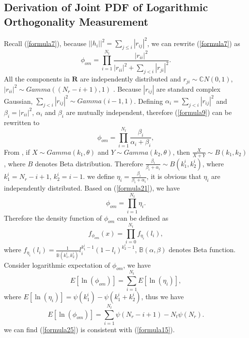 \documentclass[12pt,letter,final]{article}
\begin{document}
\begin{spacing}{2.5}
\section{Derivation of Joint PDF of Logarithmic Orthogonality Measurement}
Recall (\ref{formula7}), because $||h_{i}||^{2}=\sum_{j\leq i}|r_{ij}|^{2}$, we can rewrite (\ref{formula7}) as
\begin{equation}
\phi_{om}=\prod_{i=1}^{N_{t}}\frac{|r_{ii}|^{2}}{|r_{ii}|^{2}+\sum_{j<i}|r_{ji}|^{2}}.
\end{equation}
All the components in $\mathbf{R}$ are independently distributed and $r_{ji}\sim \mathbb{C}N(0,1)$, $|r_{ii}|^{2}\sim Gamma((N_{r}-i+1),1)$ \cite{nagar2011expectations}. Because $|r_{ij}|$ are standard complex Gaussian, $\sum_{j<i}|r_{ij}|^{2}\sim Gamma(i-1, 1)$. Defining $\alpha_{i}=\sum_{j<i}|r_{ij}|^{2}$ and $\beta_{i}=|r_{ii}|^{2}$, $\alpha_{i}$ and $\beta_{i}$ are mutually independent, therefore (\ref{formula9}) can be rewritten to 
\begin{equation}
\phi_{om}=\prod_{i=1}^{N_{t}}\frac{\beta_{i}}{\alpha_{i}+\beta_{i}},
\label{formula21}
\end{equation}
From \cite{gupta2004handbook}, if $X\sim Gamma(k_{1},\theta)$ and $Y\sim Gamma(k_{2},\theta)$, then $\frac{X}{X+Y}\sim B(k_{1},k_{2})$, where $B$ denotes Beta distribution. Therefore $\frac{\beta_{i}}{\beta_{i}+\alpha_{i}}\sim B(k^{i}_{1}, k^{i}_{2})$, where $k^{i}_{1}=N_{r}-i+1$, $k^{i}_{2}=i-1$. we define $\eta_{i}=\frac{\beta_{i}}{\beta_{i}+\alpha_{i}}$, it is obvious that $\eta_{i}$ are independently distributed. Based on (\ref{formula21}), we have 
\begin{equation}
\phi_{om}=\prod_{i=1}^{N_{t}}\eta_{i}.
\label{formula22}
\end{equation}
Therefore the density function of $\phi_{om}$ can be defined as
\begin{equation}
f_{\phi_{om}}(x)=\prod_{i=0}^{N_{t}}f_{\eta_{i}}(l_{i}),
\label{formula23}
\end{equation}
where $f_{\eta_{i}}(l_{i})=\frac{1}{\mathbb{B}(k^{i}_{1},k^{i}_{2})}l_{i}^{k^{i}_{1}-1}(1-l_{i})^{k^{i}_{2}-1}$, $\mathbb{B}(\alpha, \beta)$ denotes Beta function.
Consider logarithmic expectation of $\phi_{om}$, we have
\begin{equation}
E[\ln(\phi_{om})]=\sum_{i=1}^{N_{t}}E[\ln(\eta_{i})],
\label{formula24}
\end{equation}
where $E[\ln(\eta_{i})]=\psi(k^{i}_{1})-\psi(k^{i}_{1}+k^{i}_{2})$, thus we have 
\begin{equation}
E[\ln(\phi_{om})]=\sum_{i=1}^{N_{t}}\psi(N_{r}-i+1)-N_{t}\psi(N_{r}).
\label{formula25}
\end{equation}
we can find (\ref{formula25}) is consistent with (\ref{formula15}). 


\end{spacing}
\end{document}
